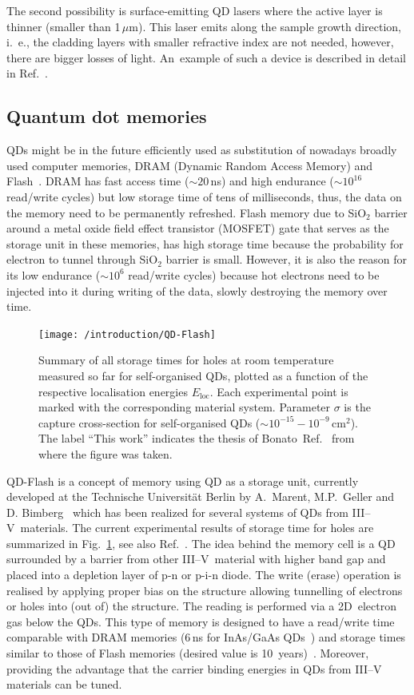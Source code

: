 \documentclass[
a4paper, %
11pt, %
onecolumn, %
openany, %
oldfontcommands,
]{memoir}
\begin{document}
The second possibility is surface-emitting QD lasers where the active layer is thinner (smaller than 1$\,\mu$m). This laser emits along the sample growth direction, i.~e., the cladding layers with smaller refractive index are not needed, however, there are bigger losses of light. An~example of such a device is described in detail in Ref.~\cite{Saito}.



\subsection*{Quantum dot memories}
QDs might be in the future efficiently used as substitution of nowadays broadly used computer memories, DRAM (Dynamic Random Access Memory) and Flash~\cite{Pavan,Sherwin}. DRAM has fast access time ($\sim20$$\,$ns) and high endurance ($\sim10^{16}$ read/write cycles) but low storage time of tens of milliseconds, thus, the data on the memory need to be permanently refreshed. Flash memory due to SiO$_2$ barrier around a metal oxide field effect transistor (MOSFET) gate that serves as the storage unit in these memories, has high storage time because the probability for electron to tunnel through SiO$_2$ barrier is small. However, it is also the reason for its low endurance ($\sim 10^{6}$ read/write cycles) because hot electrons need to be injected into it during writing of the data, slowly destroying the memory over time. 
%
\begin{figure}
	\centering
	\texttt{[image: /introduction/QD-Flash]}
	\caption{Summary of all storage times for holes at room temperature measured so far for self-organised QDs, plotted as a function of the respective localisation energies $E_\mathrm{loc}$. Each experimental point is marked with the corresponding material system. Parameter $\sigma$ is the capture cross-section for self-organised QDs ($\sim10^{ -15} -10^ {-9}$$\,$cm$^2$). The label \enquote{This work} indicates the thesis of Bonato~Ref.~\cite{t_bonato} from where the figure was taken.}
	\label{fig:intr:QD-flash}
\end{figure}

QD-Flash is a concept of memory using QD as a storage unit, currently developed at the Technische Universität Berlin by A.~Marent, M.P.~Geller and D. Bimberg~\cite{Marent_SST2011_QDFlash} which has been realized for several systems of QDs from III--V~materials. The current experimental results of storage time for holes are summarized in Fig.~\ref{fig:intr:QD-flash}, see also Ref.~\cite{t_bonato}. The idea behind the memory cell is a QD surrounded by a barrier from other III--V~material with higher band gap and placed into a depletion layer of p-n or p-i-n diode. The write (erase) operation is realised by applying proper bias on the structure allowing tunnelling of electrons or holes into (out of) the structure. The reading is performed via a 2D~electron gas below the QDs. This type of memory is designed to have a read/write time comparable with DRAM memories (6$\,$ns for InAs/GaAs QDs~\cite{GellerAPL}) and storage times similar to those of Flash memories (desired value is 10~years)~\cite{GellerAPL,GellerJOP}. Moreover, providing the advantage that the carrier binding energies in QDs from III--V materials can be tuned. 
\end{document}
